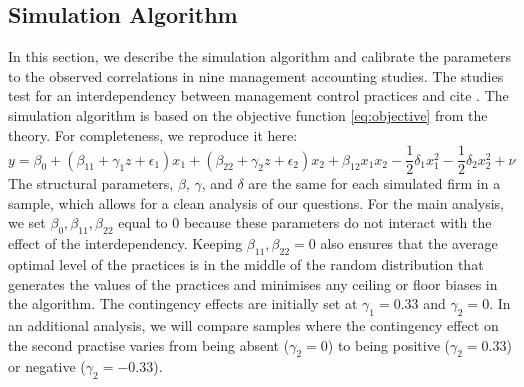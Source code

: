 \documentclass[12pt]{article}
\begin{document}
\subsection{Simulation Algorithm}

In this section, we describe the simulation algorithm and calibrate the parameters to the observed correlations in nine management accounting studies. The studies test for an interdependency between management control practices and cite \citet{grabner_management_2013}. The simulation algorithm is based on the objective function \eqref{eq:objective} from the theory. For completeness, we reproduce it here:
\begin{equation*}
y  = \beta_0 + (\beta_{11} + \gamma_1 z + \epsilon_1) x_1 
						+ (\beta_{22} + \gamma_2 z  + \epsilon_2) x_2 
                        + \beta_{12} x_1 x_2 - \frac{1}{2}\delta_1 x^2_1 - \frac{1}{2}\delta_2 x^2_2 + \nu
\end{equation*}
The structural parameters, $\beta$, $\gamma$, and $\delta$ are the same for each simulated firm in a sample, which allows for a clean analysis of our questions. For the main analysis, we set $\beta_0, \beta_{11}, \beta_{22}$ equal to $0$ because these parameters do not interact with the effect of the interdependency. Keeping $\beta_{11}, \beta_{22} = 0$ also ensures that the average optimal level of the practices is in the middle of the random distribution that generates the values of the practices and minimises any ceiling or floor biases in the algorithm. The contingency effects are initially set at $\gamma_1 = 0.33$ and $\gamma_2 = 0$. In an additional analysis, we will compare samples where the contingency effect on the second practise varies from being absent ($\gamma_2 = 0$) to being positive ($\gamma_2 = 0.33$) or negative ($\gamma_2 = -0.33$).  
\end{document}
